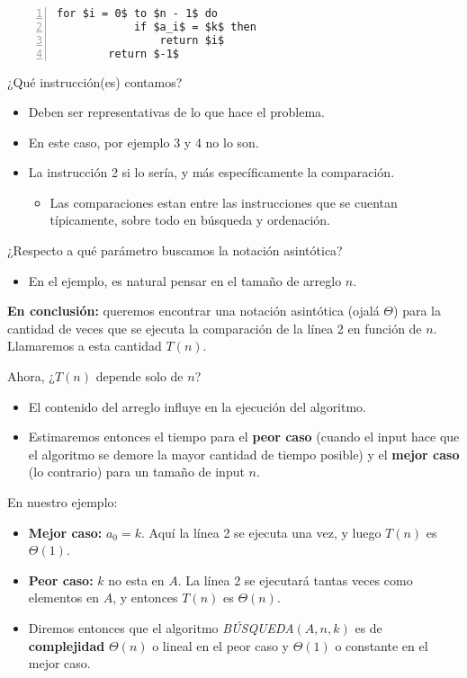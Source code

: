 \begin{multicols}{2}
    \begin{lstlisting}[numbers=left, numbersep=-10pt, mathescape]
        for $i = 0$ to $n - 1$ do
            if $a_i$ = $k$ then
                return $i$
        return $-1$
    \end{lstlisting}
    
    ¿Qué instrucción(es) contamos?
    \begin{itemize}
        \item Deben ser representativas de lo que hace el problema.
        \item En este caso, por ejemplo 3 y 4 no lo son.
        \item La instrucción 2 si lo sería, y más específicamente la comparación.
        \begin{itemize}
            \item Las comparaciones estan entre las instrucciones que se cuentan típicamente, sobre todo en búsqueda y ordenación.
        \end{itemize}
    \end{itemize}
    
    ¿Respecto a qué parámetro buscamos la notación asintótica?
    \begin{itemize}
        \item En el ejemplo, es natural pensar en el tamaño de arreglo $n$.
    \end{itemize}
    
    \textbf{En conclusión:} queremos encontrar una notación asintótica (ojalá $\Theta$) para la cantidad de veces que se ejecuta la comparación de la línea 2 en función de $n$. Llamaremos a esta cantidad $T(n)$. \p
    
    Ahora, ¿$T(n)$ depende solo de $n$?
    \begin{itemize}
        \item El contenido del arreglo influye en la ejecución del algoritmo.
        \item Estimaremos entonces el tiempo para el \textbf{peor caso} (cuando el input hace que el algoritmo se demore la mayor cantidad de tiempo posible) y el \textbf{mejor caso} (lo contrario) para un tamaño de input $n$.
    \end{itemize}
    
    En nuestro ejemplo:
    \begin{itemize}
        \item \textbf{Mejor caso:} $a_0 = k$. Aquí la línea 2 se ejecuta una vez, y luego $T(n)$ es $\Theta(1)$.
        \item \textbf{Peor caso:} $k$ no esta en $A$. La línea 2 se ejecutará tantas veces como elementos en $A$, y entonces $T(n)$ es $\Theta(n)$.
        \item Diremos entonces que el algoritmo \textit{BÚSQUEDA}$(A,n,k)$ es de \textbf{complejidad} $\Theta(n)$ o lineal en el peor caso y $\Theta(1)$ o constante en el mejor caso.
    \end{itemize}
    

\end{multicols}
